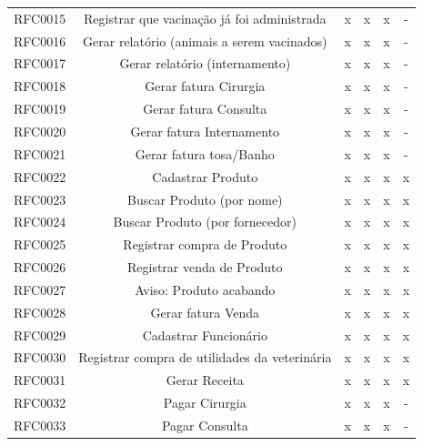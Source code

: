 \documentclass[12pt,openright,twoside,a4paper,english,french,spanish,brazil]{abntex2}
\begin{document}
\begin{landscape}
\begin{table}[!htpb]
\begin{small}
\begin{tabular}{rccccc}
    RFC0015 & Registrar que vacinação já foi administrada & x & x & x & - \\
    RFC0016 & Gerar relatório (animais a serem vacinados) & x & x & x & - \\
    RFC0017 & Gerar relatório (internamento) & x & x & x & - \\
    RFC0018 & Gerar fatura Cirurgia & x & x & x & - \\
    RFC0019 & Gerar fatura Consulta & x & x & x & - \\
    RFC0020 & Gerar fatura Internamento & x & x & x & - \\
    RFC0021 & Gerar fatura tosa/Banho & x & x & x & - \\
    RFC0022 & Cadastrar Produto & x & x & x & x \\
    RFC0023 & Buscar Produto (por nome) & x & x & x & x \\
    RFC0024 & Buscar Produto (por fornecedor) & x & x & x & x \\
    RFC0025 & Registrar compra de Produto & x & x & x & x \\
    RFC0026 & Registrar venda de Produto & x & x & x & x \\
    RFC0027 & Aviso: Produto acabando & x & x & x & x \\
    RFC0028 & Gerar fatura Venda & x & x & x & x \\
    RFC0029 & Cadastrar Funcionário & x & x & x & x \\
    RFC0030 & Registrar compra de utilidades da veterinária & x & x & x & x \\
    RFC0031 & Gerar Receita & x & x & x & x \\
    RFC0032 & Pagar Cirurgia & x & x & x & - \\
    RFC0033 & Pagar Consulta & x & x & x & - \\
    \bottomrule
    \end{tabular}%
\end{small}
\end{table}
\newpage


\end{landscape}
\end{document}
